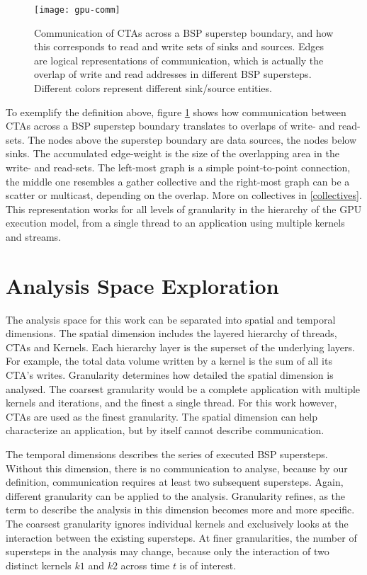 \begin{figure}[t]
	\centering
	\texttt{[image: gpu-comm]}
	\caption[CTA Communication]{Communication of CTAs across a BSP superstep boundary, and how this corresponds to read and write sets 
	of sinks and sources. Edges are logical representations of communication, which is actually the overlap of write and read addresses in different BSP supersteps. Different colors represent different sink/source entities.}
	\label{gpu-comm}
\end{figure} 
To exemplify the definition above, figure \ref{gpu-comm} shows how communication between CTAs across a 
BSP superstep boundary translates to overlaps of write- and read-sets. The nodes above the superstep boundary are data sources, the nodes below sinks. The accumulated edge-weight is the size of the 
overlapping area in the write- and read-sets. The left-most graph is a simple point-to-point connection, the middle one resembles a gather collective and the right-most graph can be a scatter or multicast, depending on the overlap. More on collectives in \ref{collectives}.
This representation works for all levels of granularity in the hierarchy of the GPU execution model, from a single thread to an application using multiple kernels and streams.

\section{Analysis Space Exploration}
The analysis space for this work can be separated into spatial and temporal dimensions. The spatial dimension includes the layered hierarchy of threads, CTAs and Kernels. Each hierarchy layer is the superset of the underlying layers. For example, the total data volume written by a kernel is the sum of all its CTA's writes. 
Granularity determines how detailed the spatial dimension is analysed.
The coarsest granularity would be a complete application with multiple kernels and iterations, and the finest a single thread. For this work however, CTAs are used as the finest granularity. The spatial dimension can help characterize an application, but by itself cannot describe communication.

The temporal dimensions describes the series of executed BSP supersteps. Without this dimension, there is no communication to analyse, because by our definition, communication requires at least two subsequent supersteps.
Again, different granularity can be applied to the analysis. Granularity refines, as the term to describe the analysis in this dimension becomes more and more specific. The coarsest granularity ignores individual kernels and exclusively looks at the interaction between the existing supersteps. At finer granularities, the number of supersteps in the analysis may change, because only the interaction of two distinct kernels $k1$ and $k2$ across time $t$ is of interest.

